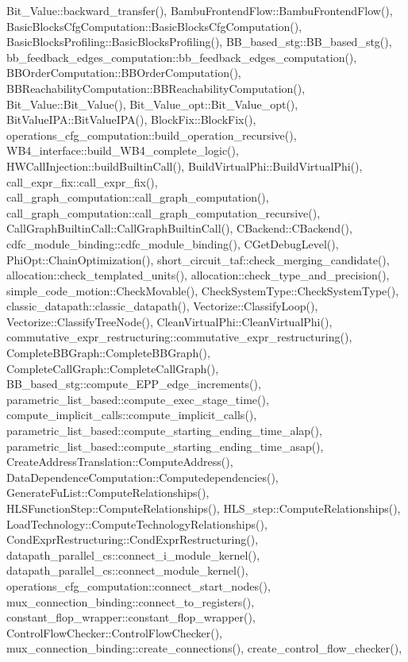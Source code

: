 Bit\+\_\+\+Value\+::backward\+\_\+transfer(), Bambu\+Frontend\+Flow\+::\+Bambu\+Frontend\+Flow(), Basic\+Blocks\+Cfg\+Computation\+::\+Basic\+Blocks\+Cfg\+Computation(), Basic\+Blocks\+Profiling\+::\+Basic\+Blocks\+Profiling(), B\+B\+\_\+based\+\_\+stg\+::\+B\+B\+\_\+based\+\_\+stg(), bb\+\_\+feedback\+\_\+edges\+\_\+computation\+::bb\+\_\+feedback\+\_\+edges\+\_\+computation(), B\+B\+Order\+Computation\+::\+B\+B\+Order\+Computation(), B\+B\+Reachability\+Computation\+::\+B\+B\+Reachability\+Computation(), Bit\+\_\+\+Value\+::\+Bit\+\_\+\+Value(), Bit\+\_\+\+Value\+\_\+opt\+::\+Bit\+\_\+\+Value\+\_\+opt(), Bit\+Value\+I\+P\+A\+::\+Bit\+Value\+I\+P\+A(), Block\+Fix\+::\+Block\+Fix(), operations\+\_\+cfg\+\_\+computation\+::build\+\_\+operation\+\_\+recursive(), W\+B4\+\_\+interface\+::build\+\_\+\+W\+B4\+\_\+complete\+\_\+logic(), H\+W\+Call\+Injection\+::build\+Builtin\+Call(), Build\+Virtual\+Phi\+::\+Build\+Virtual\+Phi(), call\+\_\+expr\+\_\+fix\+::call\+\_\+expr\+\_\+fix(), call\+\_\+graph\+\_\+computation\+::call\+\_\+graph\+\_\+computation(), call\+\_\+graph\+\_\+computation\+::call\+\_\+graph\+\_\+computation\+\_\+recursive(), Call\+Graph\+Builtin\+Call\+::\+Call\+Graph\+Builtin\+Call(), C\+Backend\+::\+C\+Backend(), cdfc\+\_\+module\+\_\+binding\+::cdfc\+\_\+module\+\_\+binding(), C\+Get\+Debug\+Level(), Phi\+Opt\+::\+Chain\+Optimization(), short\+\_\+circuit\+\_\+taf\+::check\+\_\+merging\+\_\+candidate(), allocation\+::check\+\_\+templated\+\_\+units(), allocation\+::check\+\_\+type\+\_\+and\+\_\+precision(), simple\+\_\+code\+\_\+motion\+::\+Check\+Movable(), Check\+System\+Type\+::\+Check\+System\+Type(), classic\+\_\+datapath\+::classic\+\_\+datapath(), Vectorize\+::\+Classify\+Loop(), Vectorize\+::\+Classify\+Tree\+Node(), Clean\+Virtual\+Phi\+::\+Clean\+Virtual\+Phi(), commutative\+\_\+expr\+\_\+restructuring\+::commutative\+\_\+expr\+\_\+restructuring(), Complete\+B\+B\+Graph\+::\+Complete\+B\+B\+Graph(), Complete\+Call\+Graph\+::\+Complete\+Call\+Graph(), B\+B\+\_\+based\+\_\+stg\+::compute\+\_\+\+E\+P\+P\+\_\+edge\+\_\+increments(), parametric\+\_\+list\+\_\+based\+::compute\+\_\+exec\+\_\+stage\+\_\+time(), compute\+\_\+implicit\+\_\+calls\+::compute\+\_\+implicit\+\_\+calls(), parametric\+\_\+list\+\_\+based\+::compute\+\_\+starting\+\_\+ending\+\_\+time\+\_\+alap(), parametric\+\_\+list\+\_\+based\+::compute\+\_\+starting\+\_\+ending\+\_\+time\+\_\+asap(), Create\+Address\+Translation\+::\+Compute\+Address(), Data\+Dependence\+Computation\+::\+Computedependencies(), Generate\+Fu\+List\+::\+Compute\+Relationships(), H\+L\+S\+Function\+Step\+::\+Compute\+Relationships(), H\+L\+S\+\_\+step\+::\+Compute\+Relationships(), Load\+Technology\+::\+Compute\+Technology\+Relationships(), Cond\+Expr\+Restructuring\+::\+Cond\+Expr\+Restructuring(), datapath\+\_\+parallel\+\_\+cs\+::connect\+\_\+i\+\_\+module\+\_\+kernel(), datapath\+\_\+parallel\+\_\+cs\+::connect\+\_\+module\+\_\+kernel(), operations\+\_\+cfg\+\_\+computation\+::connect\+\_\+start\+\_\+nodes(), mux\+\_\+connection\+\_\+binding\+::connect\+\_\+to\+\_\+registers(), constant\+\_\+flop\+\_\+wrapper\+::constant\+\_\+flop\+\_\+wrapper(), Control\+Flow\+Checker\+::\+Control\+Flow\+Checker(), mux\+\_\+connection\+\_\+binding\+::create\+\_\+connections(), create\+\_\+control\+\_\+flow\+\_\+checker(), 